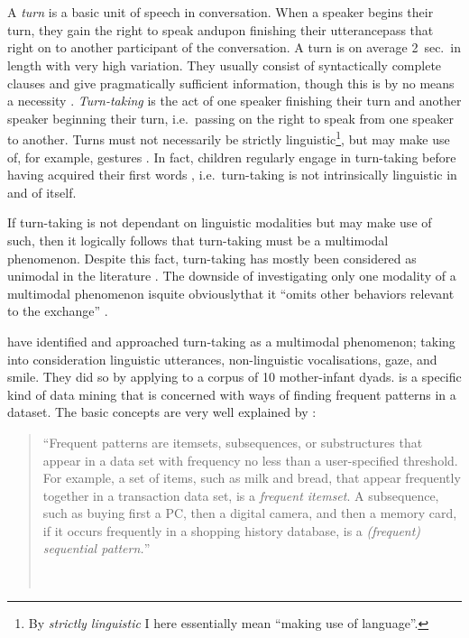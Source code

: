 
\chapter{\introduction}
\label{ch:introduction}
A \emph{turn} is a basic unit of speech in conversation. When a speaker begins their turn, they gain the right to speak and\dash upon finishing their utterance\dash pass that right on to another participant of the conversation. A turn is on average 2~sec.\ in length with very high variation. They usually consist of syntactically complete clauses and give pragmatically sufficient information, though this is by no means a necessity \citep[]{levinson16}.
\emph{Turn-taking} is the act of one speaker finishing their turn and another speaker beginning their turn, i.e.\ passing on the right to speak from one speaker to another. Turns must not necessarily be strictly linguistic\footnote{By \emph{strictly linguistic} I here essentially mean ``making use of language''.}, but may make use of, for example, gestures \citep{missingsource}. %
In fact, children regularly engage in turn-taking before having acquired their first words \citep[]{casillas16}, i.e.\ turn-taking is not intrinsically linguistic in and of itself.

If turn-taking is not dependant on linguistic modalities but may make use of such, then it logically follows that turn-taking must be a multimodal phenomenon. Despite this fact, turn-taking has mostly been considered as unimodal in the literature \citep[]{rohlfing18}. The downside of investigating only one modality of a multimodal phenomenon is\dash quite obviously\dash that it ``omits other behaviors relevant to the exchange'' \citep[]{rohlfing18}.

\citet{rohlfing18} have identified and approached turn-taking as a multimodal phenomenon; taking into consideration linguistic utterances, non-linguistic vocalisations, gaze, and smile. They did so by applying \fpmlower to a corpus of 10 mother-infant dyads. \fpmsentence is a specific kind of data mining that is concerned with ways of finding frequent patterns in a dataset. The basic concepts are very well explained by \citet{han07}:

\begin{quote}
``Frequent patterns are itemsets, subsequences, or substructures that appear in a data set with frequency no less than a user-specified threshold. For example, a set of items, such as milk and bread, that appear frequently together in a transaction data set, is a \emph{frequent itemset}. A subsequence, such as buying first a PC, then a digital camera, and then a memory card, if it occurs frequently in a shopping history database, is a \emph{(frequent) sequential pattern.}''

~ \hfill \citep[, emphasis in original]{han07}
\end{quote}

